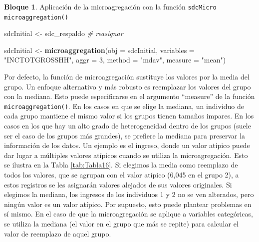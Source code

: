 \documentclass[]{book}
\newenvironment{Shaded}{\begin{snugshade}}{\end{snugshade}}
\newcommand{\CommentTok}[1]{\textcolor[rgb]{0.56,0.35,0.01}{\textit{#1}}}
\newcommand{\DataTypeTok}[1]{\textcolor[rgb]{0.13,0.29,0.53}{#1}}
\newcommand{\DecValTok}[1]{\textcolor[rgb]{0.00,0.00,0.81}{#1}}
\newcommand{\KeywordTok}[1]{\textcolor[rgb]{0.13,0.29,0.53}{\textbf{#1}}}
\newcommand{\NormalTok}[1]{#1}
\newcommand{\StringTok}[1]{\textcolor[rgb]{0.31,0.60,0.02}{#1}}
\theoremstyle{definition}
\theoremstyle{definition}
\newtheorem{example}{Bloque}[chapter]
\theoremstyle{definition}
\theoremstyle{definition}
\theoremstyle{remark}
\begin{document}
\hypertarget{section-4}{%
\subsubsection{}\label{section-4}}

\begin{example}
\protect\hypertarget{exm:bloque30jgm}{}{\label{exm:bloque30jgm} }Aplicación de la microagregación con la función \texttt{sdcMicro} \texttt{microaggregation()}
\end{example}

\begin{Shaded}
\begin{Highlighting}[]
\NormalTok{sdcInitial <-}\StringTok{ }\NormalTok{sdc_respaldo }\CommentTok{# reasignar}

\NormalTok{sdcInitial <-}\StringTok{ }\KeywordTok{microaggregation}\NormalTok{(}\DataTypeTok{obj =}\NormalTok{ sdcInitial, }\DataTypeTok{variables =} \StringTok{"INCTOTGROSSHH"}\NormalTok{, }\DataTypeTok{aggr =} \DecValTok{3}\NormalTok{, }\DataTypeTok{method =} \StringTok{"mdav"}\NormalTok{, }\DataTypeTok{measure =} \StringTok{"mean"}\NormalTok{)}
\end{Highlighting}
\end{Shaded}

Por defecto, la función de microagregación sustituye los valores por la media del grupo. Un enfoque alternativo y más robusto es reemplazar los valores del grupo con la mediana. Esto puede especificarse en el argumento ``measure'' de la función \texttt{microaggregation()}. En los casos en que se elige la mediana, un individuo de cada grupo mantiene el mismo valor si los grupos tienen tamaños impares. En los casos en los que hay un alto grado de heterogeneidad dentro de los grupos (suele ser el caso de los grupos más grandes), se prefiere la mediana para preservar la información de los datos. Un ejemplo es el ingreso, donde un valor atípico puede dar lugar a múltiples valores atípicos cuando se utiliza la microagregación. Esto se ilustra en la Tabla \ref{tab:Tabla16}. Si elegimos la media como reemplazo de todos los valores, que se agrupan con el valor atípico (6,045 en el grupo 2), a estos registros se les asignarán valores alejados de sus valores originales. Si elegimos la mediana, los ingresos de los individuos 1 y 2 no se ven alterados, pero ningún valor es un valor atípico. Por supuesto, esto puede plantear problemas en sí mismo. En el caso de que la microagregación se aplique a variables categóricas, se utiliza la mediana (el valor en el grupo que más se repite) para calcular el valor de reemplazo de aquel grupo.
\end{document}
